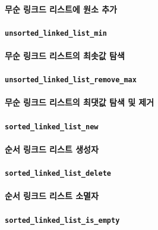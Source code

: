 \documentclass[UTF8, a4paper]{report}
\begin{document}
            \paragraph{%
                \normalfont 무순 링크드 리스트에 원소 추가
            }

            \paragraph{\texttt{unsorted\_linked\_list\_min       }}
            \paragraph{%
                \normalfont 무순 링크드 리스트의 최솟값 탐색
            }

            \paragraph{\texttt{unsorted\_linked\_list\_remove\_max}}
            \paragraph{%
                \normalfont 무순 링크드 리스트의 최댓값 탐색 및 제거
            }


            \paragraph{\texttt{sorted\_linked\_list\_new       }}
            \paragraph{%
                \normalfont 순서 링크드 리스트 생성자
            }

            \paragraph{\texttt{sorted\_linked\_list\_delete    }}
            \paragraph{%
                \normalfont 순서 링크드 리스트 소멸자
            }

            \paragraph{\texttt{sorted\_linked\_list\_is\_empty  }}
\end{document}

